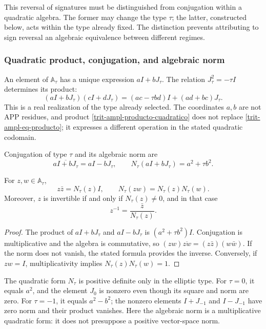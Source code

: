 This reversal of signatures must be distinguished from conjugation within a
quadratic algebra. The former may change the type \(\tau\); the latter,
constructed below, acts within the type already fixed. The
distinction prevents attributing to sign reversal an algebraic equivalence
between different regimes.

\subsubsection{Quadratic product, conjugation, and algebraic norm}
\label{trit-ampl-norma}

An element of \(\mathbb A_\tau\) has a unique expression \(aI+bJ_\tau\).
The relation \(J_\tau^2=-\tau I\) determines its product:
\begin{equation}
 (aI+bJ_\tau)(cI+dJ_\tau)
   =(ac-\tau bd)I+(ad+bc)J_\tau.
 \label{trit-ampl-producto-cuadratico}
\end{equation}
This is a real realization of the type already selected. The coordinates
\(a,b\) are not APP residues, and product
\eqref{trit-ampl-producto-cuadratico} does not replace
\eqref{trit-ampl-eq-producto}; it expresses a different operation in the stated
quadratic codomain.

\begin{definition}
\label{trit-ampl-def-norma}
Conjugation of type \(\tau\) and its algebraic norm are
\[
 \overline{aI+bJ_\tau}=aI-bJ_\tau,\qquad
 N_\tau(aI+bJ_\tau)=a^2+\tau b^2.
\]
\end{definition}

\begin{proposition}
\label{trit-ampl-prop-norma}
For \(z,w\in\mathbb A_\tau\),
\[
 z\bar z=N_\tau(z)I,\qquad
 N_\tau(zw)=N_\tau(z)N_\tau(w).
\]
Moreover, \(z\) is invertible if and only if \(N_\tau(z)\ne0\), and in that case
\[
 z^{-1}=\frac{\bar z}{N_\tau(z)}.
\]
\end{proposition}
\begin{proof}
The product of \(aI+bJ_\tau\) and \(aI-bJ_\tau\) is
\((a^2+\tau b^2)I\). Conjugation is multiplicative and the algebra is
commutative, so
\((zw)\overline{zw}=(z\bar z)(w\bar w)\). If the norm does not vanish, the
stated formula provides the inverse. Conversely, if \(zw=I\),
multiplicativity implies \(N_\tau(z)N_\tau(w)=1\).
\end{proof}

The quadratic form \(N_\tau\) is positive definite only in the elliptic type.
For \(\tau=0\), it equals \(a^2\), and the element \(J_0\) is nonzero even though its
square and norm are zero. For \(\tau=-1\), it equals \(a^2-b^2\); the
nonzero elements \(I+J_{-1}\) and \(I-J_{-1}\) have zero norm and their
product vanishes. Here the algebraic norm is a multiplicative quadratic
form: it does not presuppose a positive vector-space norm.

